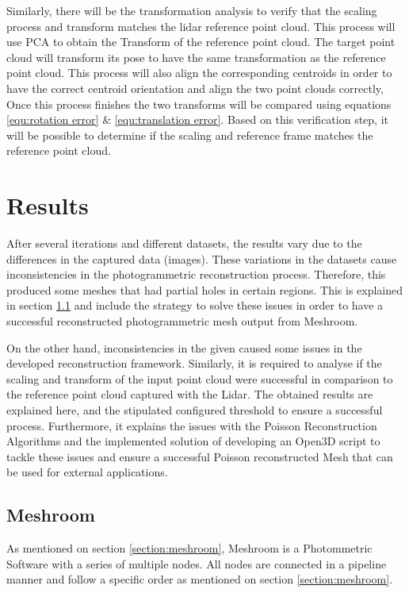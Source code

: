 \documentclass[12pt]{report}
\begin{document}
Similarly,  there will be the transformation analysis to verify that the scaling process and transform matches the lidar reference point cloud.
This process will use PCA to obtain the Transform of the reference point cloud.
The target point cloud will transform its pose to have the same transformation as the reference point cloud. This process will also align the corresponding centroids in order to have the correct centroid orientation and align the two point clouds correctly,
Once this process finishes the two transforms will be compared using equations \ref{equ:rotation error} \& \ref{equ:translation error}.
Based on this verification step, it will be possible to determine if the scaling and reference frame matches the reference point cloud.
















\newpage
\chapter{Results}
After several iterations and different datasets, the results vary due to the differences in the captured data (images). 
These variations in the datasets cause inconsistencies in the photogrammetric reconstruction process. Therefore, this produced some meshes that had partial holes in certain regions.
This is explained in section \ref{section:meshroom_results} and include the strategy to solve these issues in order to have a successful reconstructed photogrammetric mesh output from Meshroom.

On the other hand, inconsistencies in the given caused some issues in the developed reconstruction framework.
Similarly, it is required to analyse if the scaling and transform of the input point cloud were successful in comparison to the reference point cloud captured with the Lidar. 
The obtained results are explained here, and the stipulated configured threshold to ensure a successful process.
Furthermore, it explains the issues with the Poisson Reconstruction Algorithms and the implemented solution of developing an Open3D script to tackle these issues and ensure a successful Poisson reconstructed Mesh that can be used for external applications. 



\section{Meshroom}
\label{section:meshroom_results}
As mentioned on section \ref{section:meshroom}, Meshroom is a Photommetric Software with a series of multiple nodes. All  nodes are connected in a pipeline manner and follow a specific order as mentioned on section \ref{section:meshroom}.
\end{document}
